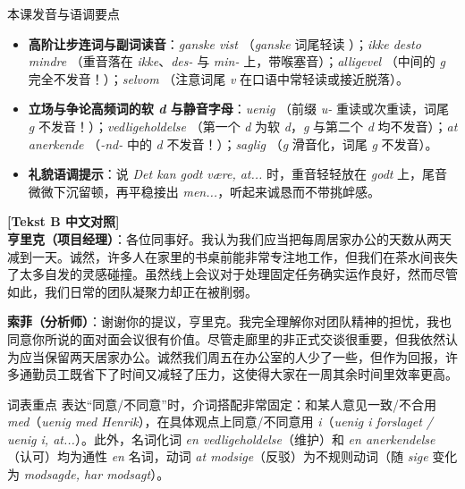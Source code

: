 \begin{tipbox}{本课发音与语调要点}
\begin{itemize}
  \item \textbf{高阶让步连词与副词读音}：\textit{ganske vist} （\textit{ganske} 词尾轻读 ）；\textit{ikke desto mindre} （重音落在 \textit{ikke}、\textit{des-} 与 \textit{min-} 上，带喉塞音）；\textit{alligevel} （中间的 \textit{g} 完全不发音！）；\textit{selvom} （注意词尾 \textit{v} 在口语中常轻读或接近脱落）。
  \item \textbf{立场与争论高频词的软 \textit{d} 与静音字母}：\textit{uenig} （前缀 \textit{u-} 重读或次重读，词尾 \textit{g} 不发音！）；\textit{vedligeholdelse} （第一个 \textit{d} 为软 \textit{d}，\textit{g} 与第二个 \textit{d} 均不发音）；\textit{at anerkende} （\textit{-nd-} 中的 \textit{d} 不发音！）；\textit{saglig} （\textit{g} 滑音化，词尾 \textit{g} 不发音）。
  \item \textbf{礼貌语调提示}：说 \textit{Det kan godt være, at...} 时，重音轻轻放在 \textit{godt} 上，尾音微微下沉留顿，再平稳接出 \textit{men...}，听起来诚恳而不带挑衅感。
\end{itemize}
\end{tipbox}

\begin{transbox}
\small
\textbf{\color{NCDTeal}[Tekst B 中文对照]}\\
\textbf{亨里克（项目经理）}：各位同事好。我认为我们应当把每周居家办公的天数从两天减到一天。诚然，许多人在家里的书桌前能非常专注地工作，但我们在茶水间丧失了太多自发的灵感碰撞。虽然线上会议对于处理固定任务确实运作良好，然而尽管如此，我们日常的团队凝聚力却正在被削弱。

\textbf{索菲（分析师）}：谢谢你的提议，亨里克。我完全理解你对团队精神的担忧，我也同意你所说的面对面会议很有价值。尽管走廊里的非正式交谈很重要，但我依然认为应当保留两天居家办公。诚然我们周五在办公室的人少了一些，但作为回报，许多通勤员工既省下了时间又减轻了压力，这使得大家在一周其余时间里效率更高。
\end{transbox}


\begin{tipbox}{词表重点}
表达“同意/不同意”时，介词搭配非常固定：和某人意见一致/不合用 \textit{med}（\textit{uenig med Henrik}），在具体观点上同意/不同意用 \textit{i}（\textit{uenig i forslaget / uenig i, at...}）。此外，名词化词 \textit{en vedligeholdelse}（维护）和 \textit{en anerkendelse}（认可）均为通性 \textit{en} 名词，动词 \textit{at modsige}（反驳）为不规则动词（随 \textit{sige} 变化为 \textit{modsagde, har modsagt}）。
\end{tipbox}

